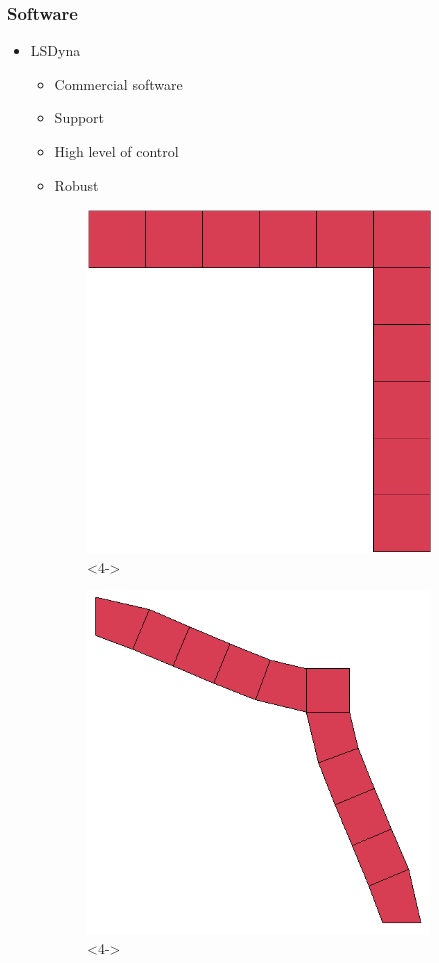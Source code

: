\documentclass[serif, pdf]{beamer}
\begin{document}

\begin{frame}
    \frametitle{Software}
    \begin{itemize}
        \item<1-> LSDyna
        \changefontsizes{11pt}
        \begin{itemize}
            \item<2-> Commercial software
            \item<2-> Support
            \item<3-> High level of control
            \item<3-> Robust
        \end{itemize}
    \end{itemize}
    \begin{figure}[ht!]
        \captionsetup{skip=0.333\baselineskip}
        \centering
        \begin{subfigure}{.49\textwidth}
            \centering
            \includegraphics[width=0.5\linewidth]{Unit_Cell_Corner_Cropped.png}<4->
        \end{subfigure}
        \begin{subfigure}{.49\textwidth}
            \centering
            \includegraphics[width=0.6\linewidth]{Unit_Cell_Corner_Deformed.png}<4->
        \end{subfigure}
    \end{figure}
\end{frame}
\end{document}
